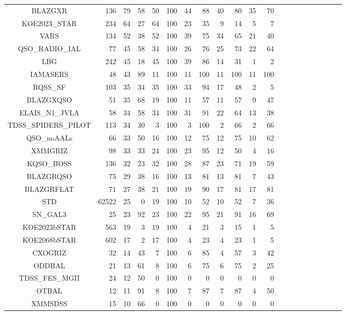 \documentclass[onecolumn]{aa}
\begin{document}
\begin{center}
\begin{longtable}{c rrr rrr rrrrrrrrrrrrrr}
BLAZGXR & 136 & 79 & 58 & 50 & 100 & 44 & 88 & 40 & 80 & 35 & 70 \\ 
KOE2023\_STAR & 234 & 64 & 27 & 64 & 100 & 23 & 35 & 9 & 14 & 5 & 7 \\ 
VARS & 134 & 52 & 38 & 52 & 100 & 39 & 75 & 34 & 65 & 21 & 40 \\ 
QSO\_RADIO\_IAL & 77 & 45 & 58 & 34 & 100 & 26 & 76 & 25 & 73 & 22 & 64 \\ 
LBG & 242 & 45 & 18 & 45 & 100 & 39 & 86 & 14 & 31 & 1 & 2 \\ 
IAMASERS & 48 & 43 & 89 & 11 & 100 & 11 & 100 & 11 & 100 & 11 & 100 \\ 
RQSS\_SF & 103 & 35 & 34 & 35 & 100 & 33 & 94 & 17 & 48 & 2 & 5 \\ 
BLAZGXQSO & 51 & 35 & 68 & 19 & 100 & 11 & 57 & 11 & 57 & 9 & 47 \\ 
ELAIS\_N1\_JVLA & 58 & 34 & 58 & 34 & 100 & 31 & 91 & 22 & 64 & 13 & 38 \\ 
TDSS\_SPIDERS\_PILOT & 113 & 34 & 30 & 3 & 100 & 3 & 100 & 2 & 66 & 2 & 66 \\ 
QSO\_noAALs & 66 & 33 & 50 & 16 & 100 & 12 & 75 & 12 & 75 & 10 & 62 \\ 
XMMGRIZ & 98 & 33 & 33 & 24 & 100 & 23 & 95 & 12 & 50 & 4 & 16 \\ 
KQSO\_BOSS & 136 & 32 & 23 & 32 & 100 & 28 & 87 & 23 & 71 & 19 & 59 \\ 
BLAZGRQSO & 75 & 29 & 38 & 16 & 100 & 13 & 81 & 13 & 81 & 7 & 43 \\ 
BLAZGRFLAT & 71 & 27 & 38 & 21 & 100 & 19 & 90 & 17 & 81 & 17 & 81 \\ 
STD & 62522 & 25 & 0 & 19 & 100 & 10 & 52 & 10 & 52 & 7 & 36 \\ 
SN\_GAL3 & 25 & 23 & 92 & 23 & 100 & 22 & 95 & 21 & 91 & 16 & 69 \\ 
KOE2023bSTAR & 563 & 19 & 3 & 19 & 100 & 4 & 21 & 3 & 15 & 1 & 5 \\ 
KOE2068bSTAR & 602 & 17 & 2 & 17 & 100 & 4 & 23 & 4 & 23 & 1 & 5 \\ 
CXOGRIZ & 32 & 14 & 43 & 7 & 100 & 6 & 85 & 4 & 57 & 3 & 42 \\ 
ODDBAL & 21 & 13 & 61 & 8 & 100 & 6 & 75 & 6 & 75 & 2 & 25 \\ 
TDSS\_FES\_MGII & 24 & 12 & 50 & 0 & 100 & 0 & 0 & 0 & 0 & 0 & 0 \\ 
OTBAL & 12 & 11 & 91 & 8 & 100 & 7 & 87 & 7 & 87 & 4 & 50 \\ 
XMMSDSS & 15 & 10 & 66 & 0 & 100 & 0 & 0 & 0 & 0 & 0 & 0 \\ 

\end{longtable}
\end{center}
\end{document}
